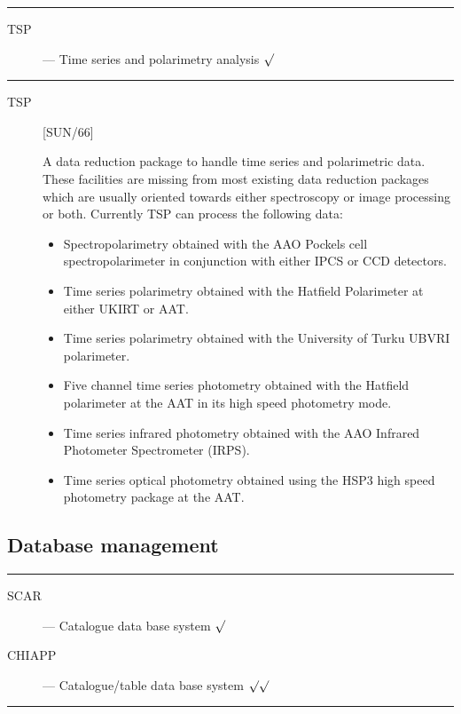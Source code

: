 \rule{\textwidth}{0.5mm}
\begin{description}
\begin{description}
\item [TSP] --- Time series and polarimetry analysis \hfill $\surd$
\end{description}
\end{description}
\rule{\textwidth}{0.5mm}

\begin{description}

\item [TSP] \hfill [SUN/66]

A data reduction package to handle time series and polarimetric data.
These facilities are missing from most existing data reduction packages which
are usually oriented towards either spectroscopy or image processing or both.
Currently TSP can process the following data:
\begin{itemize}
\item Spectropolarimetry obtained with the AAO Pockels cell
 spectropolarimeter in conjunction with either IPCS or CCD detectors.
\item Time series polarimetry obtained with the Hatfield Polarimeter
 at either UKIRT or AAT.
\item Time series polarimetry obtained with the University of Turku
 UBVRI polarimeter.
\item Five channel time series photometry obtained with the Hatfield
 polarimeter at the AAT in its high speed photometry mode.
\item Time series infrared photometry obtained with the AAO Infrared
 Photometer Spectrometer (IRPS).
\item Time series optical photometry obtained using the HSP3 high speed
photometry package at the AAT.
\end{itemize}

\end{description}

\newpage

\subsection{Database management}

\rule{\textwidth}{0.5mm}
\begin{description}
\begin{description}
\item [SCAR] --- Catalogue data base system \hfill $\surd$
\item [CHIAPP] --- Catalogue/table data base system \hfill $\surd\surd$
\end{description}
\end{description}
\rule{\textwidth}{0.5mm}

